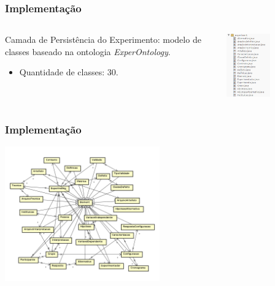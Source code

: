 \documentclass[aspectratio=169]{beamer}
\begin{document}
\begin{frame}
\frametitle{Implementação}
\justifying

\begin{columns}
\begin{column}{0.5\textwidth}

Camada de Persistência do Experimento: modelo de classes baseado na ontologia \textit{ExperOntology}.\\
\begin{itemize}
\item Quantidade de classes: 30.
\end{itemize}
   
\end{column}
\begin{column}{0.5\textwidth} 
    \begin{center}
     \includegraphics[width=0.5\textwidth]{pacote-experimento.png}
     \end{center}
\end{column}
\end{columns}

\end{frame}

\begin{frame}
\frametitle{Implementação}
\justifying

\begin{center}
\includegraphics[width=0.5\textwidth]{diagrama-classes-experimento.png}
\end{center}

\end{frame}
\end{document}
